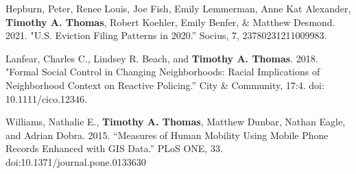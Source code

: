 

\begin{cvparagraph}

Hepburn, Peter, Renee Louis, Joe Fish, Emily Lemmerman, Anne Kat Alexander,  \textbf{Timothy A. Thomas}, Robert Koehler, Emily Benfer, \& Matthew Desmond. 2021. "U.S. Eviction Filing Patterns in 2020.” Socius, 7, 23780231211009983.
\end{cvparagraph}

\begin{cvparagraph}

Lanfear, Charles C., Lindsey R. Beach, and \textbf{Timothy A. Thomas}. 2018. "Formal Social Control in Changing Neighborhoods: Racial Implications of Neighborhood Context on Reactive Policing.” City \& Community, 17:4. doi: 10.1111/cico.12346.
\end{cvparagraph}

\begin{cvparagraph}

Williams, Nathalie E., \textbf{Timothy A. Thomas}, Matthew Dunbar, Nathan Eagle, and Adrian Dobra. 2015. “Measures of Human Mobility Using Mobile Phone Records Enhanced
with GIS Data.” PLoS ONE, 33. doi:10.1371/journal.pone.0133630
\end{cvparagraph}




